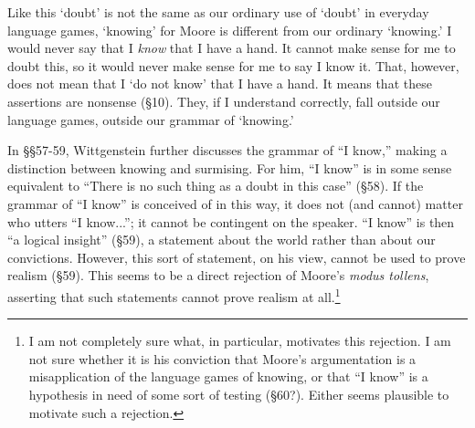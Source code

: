 \documentclass[man,12pt,natbib]{apa6}
\begin{document}
Like
this `doubt' is not the same as our ordinary use of `doubt' in everyday
language games, `knowing' for Moore is different from our ordinary `knowing.'
I would never say that I \emph{know} that I have a hand. It cannot make sense
for me to doubt this, so it would never make sense for me to say I know it.
That, however, does not mean that I `do not know' that I have a hand. It means
that these assertions are nonsense (\S 10). They, if I understand correctly,
fall outside our language games, outside our grammar of `knowing.'

In \S\S 57-59, Wittgenstein further discusses the grammar of ``I know,'' making
a distinction between knowing and surmising. For him, ``I know'' is in some
sense equivalent to ``There is no such thing as a doubt in this case'' (\S 58).
If the grammar of ``I know'' is conceived of in this way, it does not (and
cannot) matter who utters ``I know...''; it cannot be contingent on the
speaker. ``I know'' is then ``a logical insight'' (\S 59), a statement about
the world rather than about our convictions. However, this sort of statement,
on his view, cannot be used to prove realism (\S 59).  This seems to be a
direct rejection of Moore's \emph{modus tollens}, asserting that such
statements cannot prove realism at all.\footnote{I am not completely sure what,
	in particular, motivates this rejection. I am not sure whether it is his
	conviction that Moore's argumentation is a misapplication of the language
	games of knowing, or that ``I know'' is a hypothesis in need of some sort
	of testing (\S 60?). Either seems plausible to motivate such a rejection.}
\end{document}
